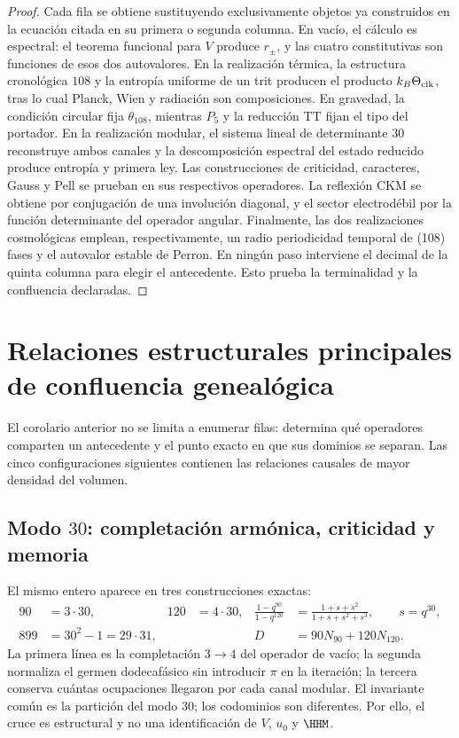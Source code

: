 \begin{proof}
Cada fila se obtiene sustituyendo exclusivamente objetos ya construidos en la
ecuaci\'on citada en su primera o segunda columna. En vac\'io, el c\'alculo
es espectral: el teorema funcional para \(V\) produce \(r_\pm\), y las cuatro
constitutivas son funciones de esos dos autovalores. En la realizaci\'on
t\'ermica, la estructura cronol\'ogica \(108\) y la entrop\'ia uniforme de
un trit producen el producto
\(k_B\Theta_{\rm clk}\), tras lo cual Planck, Wien y radiaci\'on son
composiciones. En gravedad, la condici\'on circular fija
\(\theta_{108}\), mientras \(P_5\) y la reducci\'on TT fijan el tipo del
portador. En la realizaci\'on modular, el sistema lineal de determinante \(30\)
reconstruye ambos canales y la descomposici\'on espectral del estado reducido
produce entrop\'ia y primera ley. Las construcciones de criticidad,
caracteres, Gauss y
Pell se prueban en sus respectivos operadores. La reflexi\'on CKM se obtiene
por conjugaci\'on de una involuci\'on diagonal, y el sector electrod\'ebil por
la funci\'on determinante del operador angular. Finalmente, las dos
realizaciones cosmol\'ogicas emplean, respectivamente, un radio periodicidad temporal de (108) fases y el
autovalor estable
de Perron. En ning\'un paso interviene el decimal de la quinta columna para
elegir el antecedente. Esto prueba la terminalidad y la confluencia declaradas.
\end{proof}

\section{Relaciones estructurales principales de confluencia geneal\'ogica}

El corolario anterior no se limita a enumerar filas: determina qu\'e
operadores comparten un antecedente y el punto exacto en que sus dominios se
separan. Las cinco configuraciones siguientes contienen las relaciones
causales de mayor densidad del volumen.

\subsection{Modo \(30\): completaci\'on arm\'onica, criticidad y memoria}

El mismo entero aparece en tres construcciones exactas:
\begin{equation}
\begin{aligned}
90&=3\cdot30, &120&=4\cdot30,
&\frac{1-q^{90}}{1-q^{120}}
 &=\frac{1+s+s^2}{1+s+s^2+s^3},\qquad s=q^{30},\\
899&=30^2-1=29\cdot31,
&&&D&=90N_{90}+120N_{120}.
\end{aligned}
\label{eq:atlas-mode30-confluence}
\end{equation}
La primera l\'inea es la completaci\'on \(3\to4\) del operador de vac\'io; la
segunda normaliza el germen dodecaf\'asico sin introducir \(\pi\) en la
iteraci\'on; la tercera conserva cu\'antas ocupaciones llegaron por cada canal
modular. El invariante com\'un es la partici\'on del modo \(30\); los
codominios son diferentes. Por ello, el cruce es estructural y no una
identificaci\'on de \(V\), \(u_0\) y \(\HHM\).


